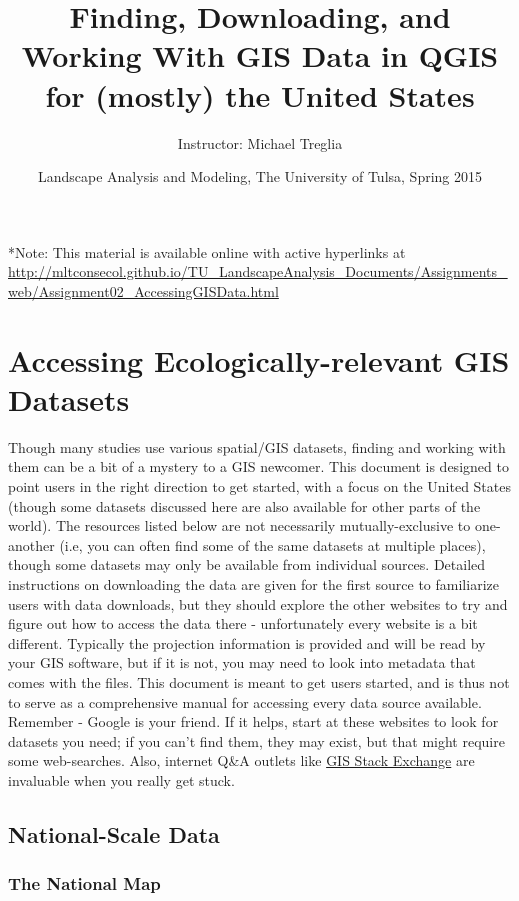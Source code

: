 \documentclass[12pt,]{article}
\title{Finding, Downloading, and Working With GIS Data in QGIS for (mostly) the
United States}
\author{Instructor: Michael Treglia}
\date{Landscape Analysis and Modeling, The University of Tulsa, Spring 2015}
\begin{document}
\maketitle

*Note: This material is available online with active hyperlinks at
\url{http://mltconsecol.github.io/TU_LandscapeAnalysis_Documents/Assignments_web/Assignment02_AccessingGISData.html}

\section{Accessing Ecologically-relevant GIS
Datasets}\label{accessing-ecologically-relevant-gis-datasets}

Though many studies use various spatial/GIS datasets, finding and
working with them can be a bit of a mystery to a GIS newcomer. This
document is designed to point users in the right direction to get
started, with a focus on the United States (though some datasets
discussed here are also available for other parts of the world). The
resources listed below are not necessarily mutually-exclusive to
one-another (i.e, you can often find some of the same datasets at
multiple places), though some datasets may only be available from
individual sources. Detailed instructions on downloading the data are
given for the first source to familiarize users with data downloads, but
they should explore the other websites to try and figure out how to
access the data there - unfortunately every website is a bit different.
Typically the projection information is provided and will be read by
your GIS software, but if it is not, you may need to look into metadata
that comes with the files. This document is meant to get users started,
and is thus not to serve as a comprehensive manual for accessing every
data source available. Remember - Google is your friend. If it helps,
start at these websites to look for datasets you need; if you can't find
them, they may exist, but that might require some web-searches. Also,
internet Q\&A outlets like \href{http://gis.stackexchange.com/}{GIS
Stack Exchange} are invaluable when you really get stuck.

\subsection{National-Scale Data}\label{national-scale-data}

\subsubsection{The National Map}\label{the-national-map}
\end{document}
